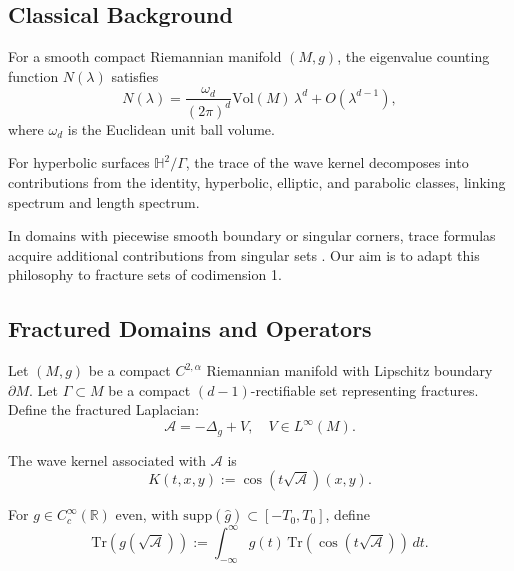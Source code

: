 \subsection{Classical Background}

\begin{theorem}
For a smooth compact Riemannian manifold $(M,g)$,
the eigenvalue counting function $N(\lambda)$ satisfies
\[
N(\lambda) = \frac{\omega_d}{(2\pi)^d} \mathrm{Vol}(M)\,\lambda^d
+ O(\lambda^{d-1}),
\]
where $\omega_d$ is the Euclidean unit ball volume.
\end{theorem}

\begin{theorem}
For hyperbolic surfaces $\mathbb{H}^2/\Gamma$,
the trace of the wave kernel decomposes into contributions
from the identity, hyperbolic, elliptic, and parabolic classes,
linking spectrum and length spectrum.
\end{theorem}

\begin{remark}
In domains with piecewise smooth boundary or singular corners,
trace formulas acquire additional contributions from singular sets
\cite{melrose1983scattering, ivrii1980second}.
Our aim is to adapt this philosophy to fracture sets of codimension 1.
\end{remark}

\bigskip


\subsection{Fractured Domains and Operators}

Let $(M,g)$ be a compact $C^{2,\alpha}$ Riemannian manifold with Lipschitz boundary $\partial M$.
Let $\Gamma \subset M$ be a compact $(d-1)$-rectifiable set representing fractures.
Define the fractured Laplacian:
\[
\mathcal{A} = -\Delta_g + V, \quad V \in L^\infty(M).
\]

\begin{definition}
The wave kernel associated with $\mathcal{A}$ is
\[
K(t,x,y) := \cos(t\sqrt{\mathcal{A}})(x,y).
\]
\end{definition}

\begin{definition}
For $g \in C^\infty_c(\mathbb{R})$ even, with
$\mathrm{supp}(\widehat{g}) \subset [-T_0,T_0]$, define
\[
\mathrm{Tr}(g(\sqrt{\mathcal{A}})) :=
\int_{-\infty}^\infty g(t)\,\mathrm{Tr}(\cos(t\sqrt{\mathcal{A}}))\,dt.
\]
\end{definition}

